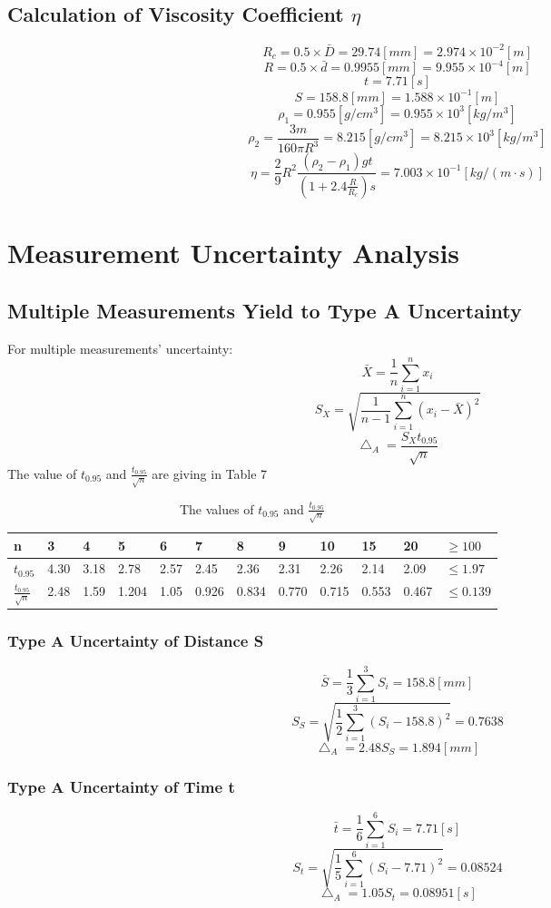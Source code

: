 \documentclass[12pt]{article}
\begin{document}
\subsection{Calculation of Viscosity Coefficient $\eta$}
$$R_c=0.5\times \bar{D}=29.74[mm]=2.974\times 10^{-2}[m]$$
$$R=0.5\times \bar{d}=0.9955[mm]=9.955\times 10^{-4}[m]$$
$$t=7.71[s]$$
$$S=158.8[mm]=1.588\times10^{-1}[m]$$
$$\rho_1=0.955[g/cm^3]=0.955\times 10^3[kg/m^3]$$
$$\rho_2=\frac{3m}{160\pi R^3}=8.215[g/cm^3]=8.215\times 10^3[kg/m^3]$$
$$\eta=\frac{2}{9}R^2\frac{(\rho_2-\rho_1)gt}{(1+2.4\frac{R}{R_c})s}=7.003\times10^{-1}[kg/(m\cdot{s})]$$
\section{Measurement Uncertainty Analysis}
\subsection{Multiple Measurements Yield to Type A Uncertainty}
For multiple measurements' uncertainty:
$$\bar{X}=\frac{1}{n}\sum_{i=1}^nx_i$$
$$S_X=\sqrt{\frac{1}{n-1}\sum_{i=1}^n(x_i-\bar{X})^2}$$  
$$\bigtriangleup_A=\frac{S_Xt_{0.95}}{\sqrt{n}}$$
The value of $t_0.95$ and $\frac{t_{0.95}}{\sqrt{n}}$ are giving in Table 7 
\begin{table}[H]
\centering
\begin{tabular}{|l|l|l|l|l|l|l|l|l|l|l|l|}
\hline
n                         & 3    & 4    & 5     & 6    & 7     & 8     & 9     & 10    & 15    & 20    & $\ge100$   \\ \hline
$t_0.95$                  & 4.30 & 3.18 & 2.78  & 2.57 & 2.45  & 2.36  & 2.31  & 2.26  & 2.14  & 2.09  & $\le1.97$  \\ \hline
$\frac{t_0.95}{\sqrt{n}}$ & 2.48 & 1.59 & 1.204 & 1.05 & 0.926 & 0.834 & 0.770 & 0.715 & 0.553 & 0.467 & $\le0.139$ \\ \hline
\end{tabular}
\caption{The values of $t_{0.95}$ and $\frac{t_{0.95}}{\sqrt{n}}$}
\end{table}
\subsubsection{Type A Uncertainty of Distance S}
$$\bar{S}=\frac{1}{3}\sum_{i=1}^3{S_i}=158.8[mm]$$
$$S_S=\sqrt{\frac{1}{2}\sum_{i=1}^3{(S_i-158.8)^2}}=0.7638$$
$$\bigtriangleup_A=2.48S_S=1.894[mm]$$
\subsubsection{Type A Uncertainty of Time t}
$$\bar{t}=\frac{1}{6}\sum_{i=1}^6{S_i}=7.71[s]$$
$$S_t=\sqrt{\frac{1}{5}\sum_{i=1}^6{(S_i-7.71)^2}}=0.08524$$
$$\bigtriangleup_A=1.05S_t=0.08951[s]$$
\end{document}
